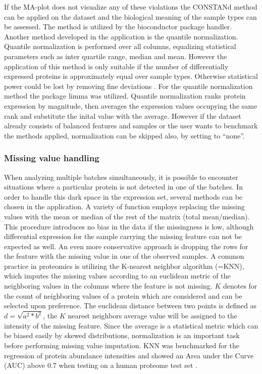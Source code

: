 \documentclass[
  11pt,
]{article}
\begin{document}
If the MA-plot does not visualize any of these violations the CONSTANd method can be applied on the dataset and the biological meaning of the sample types can be assessed. The method is utilized by the bioconductor package handler.
Another method developed in the application is the quantile normalization. Quantile normalization is performed over all columns, equalizing statistical parameters such as inter quartile range, median and mean. However the application of this method is only suitable if the number of differentially expressed proteins is approximately equal over sample types. Otherwise statistical power could be lost by removing fine deviations \citep{Zhao2020}. For the quantile normalization method the package limma was utilized. Quantile normalization ranks protein expression by magnitude, then averages the expression values occupying the same rank and substitute the inital value with the average.
However if the dataset already consists of balanced features and samples or the user wants to benchmark the methods applied, normalization can be skipped also, by setting to ``none''.

\hypertarget{missing-value-handling}{%
\subsubsection{Missing value handling}\label{missing-value-handling}}

When analyzing multiple batches simultaneously, it is possible to encounter situations where a particular protein is not detected in one of the batches. In order to handle this dark space in the expression set, several methods can be chosen in the application.
A variety of function employs replacing the missing values with the mean or median of the rest of the matrix (total mean/median). This procedure introduces no bias in the data if the missingness is low, although differential expression for the sample carrying the missing feature can not be expected as well. An even more conservative approach is dropping the rows for the feature with the missing value in one of the observed samples.
A common practice in proteomics is utilizing the K-nearest neighbor algorithm (=KNN), which imputes the missing values according to an euclidean metric of the neighboring values in the columns where the feature is not missing. \(K\) denotes for the count of neighboring values of a protein which are considered and can be selected upon preference. The euclidean distance between two points is defined as \(d = \sqrt{a^2 * b^2}\), the \(K\) nearest neighbors average value will be assigned to the intensity of the missing feature. Since the average is a statistical metric which can be biased easily by skewed distributions, normalization is an important task before performing missing value imputation. KNN was benchmarked for the regression of protein abundance intensities and showed an Area under the Curve (AUC) above 0.7 when testing on a human proteome test set \citep{Lan2013}.
\end{document}
